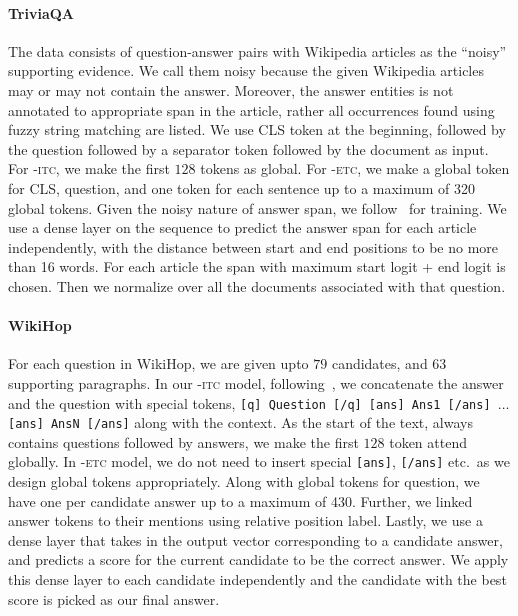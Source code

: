 \paragraph{TriviaQA}
The data consists of question-answer pairs with Wikipedia articles as the ``noisy'' supporting evidence.
We call them noisy because the given Wikipedia articles may or may not contain the answer.
Moreover, the answer entities is not annotated to appropriate span in the article, rather all occurrences found using fuzzy string matching are listed.
We use CLS token at the beginning, followed by the question followed by a separator token followed by the document as input.
For \bigb-\textsc{itc}, we make the first $128$ tokens as global. 
For \bigb-\textsc{etc}, we make a global token for CLS, question, and one token for each sentence up to a maximum of 320 global tokens.
Given the noisy nature of answer span, we follow~\citet{clark2017simple} for training.
We use a dense layer on the sequence to predict the answer span for each article independently, with the distance between start and end positions to be no more than 16 words.
For each article the span with maximum start logit + end logit is chosen.
Then we normalize over all the documents associated with that question.


\paragraph{WikiHop}
For each question in WikiHop, we are given upto $79$ candidates, and $63$ supporting paragraphs.
In our \bigb-\textsc{itc} model, following~\citet{beltagy2020longformer}, we concatenate the answer and the question with special tokens, 
\texttt{[q] Question [/q] [ans] Ans1 [/ans] $\ldots$ [ans] AnsN [/ans]} along with the context. 
As the start of the text, always contains questions followed by answers, we make the first $128$ token attend globally. 
In \bigb-\textsc{etc} model, we do not need to insert special \texttt{[ans]}, \texttt{[/ans]} etc.~as we design global tokens appropriately.
Along with global tokens for question, we have one per candidate answer up to a maximum of 430.
Further, we linked answer tokens to their mentions using relative position label. 
Lastly, we use a dense layer that takes in the output vector corresponding to a candidate answer, and predicts a score for the current candidate to be the correct answer.
We apply this dense layer to each candidate independently and 
the candidate with the best score is picked as our final answer.



